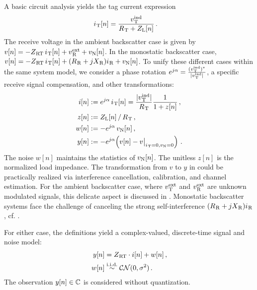 
A basic circuit analysis yields the tag current expression
\begin{align}
\iTx[n] &= \f{v\Ind\Tx}{R\Tx + Z\L[n]} %
\label{eq:Current} \, .
\end{align}
The receive voltage in the ambient backscatter case is given by
$v[n] = -Z_{\hspace{.2mm}\mathrm{RT}}\,i_{\hspace{.2mm}\mathrm{T}}[n] + v^\mathrm{ext}_{\hspace{.2mm}\mathrm{R}} + v_\mathrm{N}[n]$.
In the monostatic backscatter case,
$v[n] = -Z_{\hspace{.2mm}\mathrm{RT}}\,i_{\hspace{.2mm}\mathrm{T}}[n] + (R_{\hspace{.2mm}\mathrm{R}} + jX_{\hspace{.2mm}\mathrm{R}}) i_{\hspace{.2mm}\mathrm{R}} + v_\mathrm{N}[n]$.
%
To unify these different cases within the same system model, we consider a phase rotation
$e^{j\alpha} = \frac{(v^\mathrm{ind}_{\hspace{.2mm}\mathrm{T}})^*}{|v^\mathrm{ind}_{\hspace{.2mm}\mathrm{T}}|}$, a specific receive signal compensation,
and other transformations:
\begin{align}
i[n] &:= e^{j\alpha} \, i_{\hspace{.2mm}\mathrm{T}}[n]
= \frac{|v^\mathrm{ind}_{\hspace{.2mm}\mathrm{T}}|}{R_{\hspace{.2mm}\mathrm{T}}} \frac{1}{1 + z[n]}
\label{eq:TxSignalDef} \, , \\
z[n] &:= Z_\mathrm{L}[n] \, / \, R_{\hspace{.2mm}\mathrm{T}}
\label{eq:NormalizedZ} \, , \\
w[n] &:= -e^{j\alpha} \, v_\mathrm{N}[n]
\label{eq:NoiseDef} \, , \\
y[n] &:= -e^{j\alpha} \!\left( v[n] - v\big|_{i_{\hspace{.2mm}\mathrm{T}} = 0, v_\mathrm{N} = 0}  \right)
\label{eq:ObservationDef} \, .
\end{align}
The noise $w[n]$ maintains the statistics of $v_\mathrm{N}[n]$. The unitless $z[n]$ is the normalized load impedance. The transformation from $v$ to $y$ in  could be practically realized via interference cancellation, calibration, and channel estimation. For the ambient backscatter case, where $v^\mathrm{ext}_{\hspace{.2mm}\mathrm{T}}$ and $v^\mathrm{ext}_{\hspace{.2mm}\mathrm{R}}$ are unknown modulated signals, this delicate aspect is discussed in . Monostatic backscatter systems face the challenge of canceling the strong self-interference $(R_{\hspace{.2mm}\mathrm{R}} + jX_{\hspace{.2mm}\mathrm{R}}) i_{\hspace{.2mm}\mathrm{R}}$, cf. \cite{Finkenzeller2015}.

For either case, the definitions  yield a complex-valued, discrete-time signal and noise model:
\begin{align}
y[n] &= Z_{\hspace{.2mm}\mathrm{RT}} \cdot i[n] + w[n]
\label{eq:SignalModel}
\, , \\
w[n] &\overset{\text{i.i.d.}}{\sim} \mathcal{CN}(0,\sigma^2)
\, .
\label{eq:NoiseModel}
\end{align}
The observation $y[n] \in \mathbb{C}$ is considered without quantization.